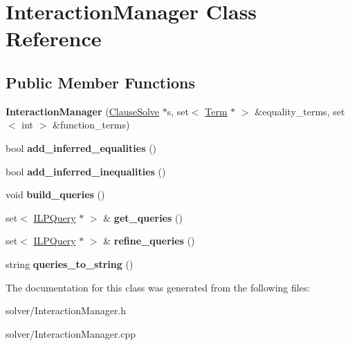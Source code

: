 \hypertarget{classInteractionManager}{\section{\-Interaction\-Manager \-Class \-Reference}
\label{classInteractionManager}
}
\subsection*{\-Public \-Member \-Functions}
\begin{DoxyCompactItemize}
\item 
\hypertarget{classInteractionManager_a48325cce50121fb4263f9104e0c7803f}{{\bfseries \-Interaction\-Manager} (\hyperlink{classClauseSolve}{\-Clause\-Solve} $\ast$s, set$<$ \hyperlink{classTerm}{\-Term} $\ast$ $>$ \&equality\-\_\-terms, set$<$ int $>$ \&function\-\_\-terms)}\label{classInteractionManager_a48325cce50121fb4263f9104e0c7803f}

\item 
\hypertarget{classInteractionManager_a93d127911d029b27977b3fcc442c375a}{bool {\bfseries add\-\_\-inferred\-\_\-equalities} ()}\label{classInteractionManager_a93d127911d029b27977b3fcc442c375a}

\item 
\hypertarget{classInteractionManager_a45eded00bd7b495ffd84f9a39b2cd649}{bool {\bfseries add\-\_\-inferred\-\_\-inequalities} ()}\label{classInteractionManager_a45eded00bd7b495ffd84f9a39b2cd649}

\item 
\hypertarget{classInteractionManager_a6e274b0bb9a96546781929f5175b43e8}{void {\bfseries build\-\_\-queries} ()}\label{classInteractionManager_a6e274b0bb9a96546781929f5175b43e8}

\item 
\hypertarget{classInteractionManager_a528262e6fa3c668032ee3ffd264e2767}{set$<$ \hyperlink{classILPQuery}{\-I\-L\-P\-Query} $\ast$ $>$ \& {\bfseries get\-\_\-queries} ()}\label{classInteractionManager_a528262e6fa3c668032ee3ffd264e2767}

\item 
\hypertarget{classInteractionManager_a32feeadb0b83bb4b14b944a144ce9035}{set$<$ \hyperlink{classILPQuery}{\-I\-L\-P\-Query} $\ast$ $>$ \& {\bfseries refine\-\_\-queries} ()}\label{classInteractionManager_a32feeadb0b83bb4b14b944a144ce9035}

\item 
\hypertarget{classInteractionManager_a95aad63b3dcf27795fa9b60cc076f974}{string {\bfseries queries\-\_\-to\-\_\-string} ()}\label{classInteractionManager_a95aad63b3dcf27795fa9b60cc076f974}

\end{DoxyCompactItemize}


\-The documentation for this class was generated from the following files\-:\begin{DoxyCompactItemize}
\item 
solver/\-Interaction\-Manager.\-h\item 
solver/\-Interaction\-Manager.\-cpp\end{DoxyCompactItemize}
